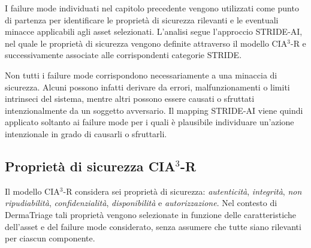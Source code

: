 I failure mode individuati nel capitolo precedente vengono utilizzati come punto di partenza per identificare le proprietà di sicurezza rilevanti e le eventuali minacce applicabili agli asset selezionati. L'analisi segue l'approccio STRIDE-AI, nel quale le proprietà di sicurezza vengono definite attraverso il modello CIA$^3$-R e successivamente associate alle corrispondenti categorie STRIDE.

Non tutti i failure mode corrispondono necessariamente a una minaccia di sicurezza. Alcuni possono infatti derivare da errori, malfunzionamenti o limiti intrinseci del sistema, mentre altri possono essere causati o sfruttati intenzionalmente da un soggetto avversario. Il mapping STRIDE-AI viene quindi applicato soltanto ai failure mode per i quali è plausibile individuare un'azione intenzionale in grado di causarli o sfruttarli.

\subsection{Proprietà di sicurezza CIA$^3$-R}
Il modello CIA$^3$-R considera sei proprietà di sicurezza: \textit{autenticità}, \textit{integrità}, \textit{non ripudiabilità}, \textit{confidenzialità}, \textit{disponibilità} e \textit{autorizzazione}. Nel contesto di DermaTriage tali proprietà vengono selezionate in funzione delle caratteristiche dell'asset e del failure mode considerato, senza assumere che tutte siano rilevanti per ciascun componente.



